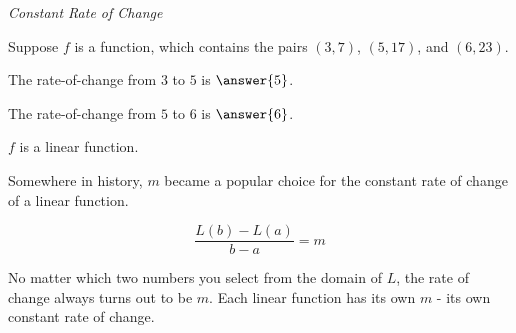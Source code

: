 \documentclass{ximera}
\begin{document}
\begin{example} \textit{Constant Rate of Change}


Suppose $f$ is a function, which contains the pairs $(3, 7)$, $(5, 17)$, and $(6, 23)$.


The rate-of-change from $3$ to $5$ is $\answer{5}$.

The rate-of-change from $5$ to $6$ is $\answer{6}$.

\begin{question} 
$f$ is a linear function.
\begin{multipleChoice}
\end{multipleChoice}
\end{question}

\end{example}


Somewhere in history, $m$ became a popular choice for the constant rate of change of a linear function.



\[
\frac{L(b) - L(a)}{b - a} = m
\]





No matter which two numbers you select from the domain of $L$, the rate of change always turns out to be $m$.  Each linear function has its own $m$ - its own constant rate of change.
\end{document}
